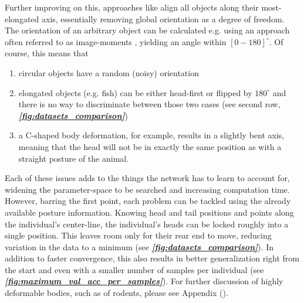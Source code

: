 \documentclass[9pt,lineno]{elife}
\newcommand{\figref}[1]{\textit{\textbf{\ref{#1}}}}
\newcommand{\idtracker}{\protect\path{ idtracker.ai}}
\newcommand{\changemade}[1]{#1}
\begin{document}
Further improving on this, approaches like \idtracker{} align all objects along their most-elongated axis, essentially removing global orientation as a degree of freedom. The orientation of an arbitrary object can be calculated e.g. using an approach often referred to as image-moments \citep{hu1962visual}, yielding an angle within $[0-180]^\circ$. Of course, this means that

\begin{enumerate}
\item circular objects have a random (noisy) orientation
\item elongated objects (e.g. fish) can be either head-first or flipped by $180^\circ$ and there is no way to discriminate between those two cases (see second row, \figref{fig:datasets_comparison})
\item a C-shaped body deformation, for example, results in a slightly bent axis, meaning that the head will not be in exactly the same position as with a straight posture of the animal.
\end{enumerate}


Each of these issues adds to the things the network has to learn to account for, widening the parameter-space to be searched and increasing computation time. However, barring the first point, each problem can be tackled using the already available posture information. Knowing head and tail positions and points along the individual's center-line, the individual's heads can be locked roughly into a single position. This leaves room only for their rear end to move, reducing variation in the data to a minimum (see \figref{fig:datasets_comparison}). In addition to faster convergence, this also results in better generalization right from the start and even with a smaller number of samples per individual (see \figref{fig:maximum_val_acc_per_samples}). \changemade{For further discussion of highly deformable bodies, such as of rodents, please see Appendix (\nameref{sec:deformable_bodies}).}
\end{document}

